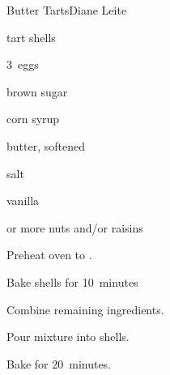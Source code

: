 \begin{recipe}{Butter Tarts}{Diane Leite}{}

\begin{ingredients}
\item tart shells
\item 3~eggs
\item {} brown sugar
\item \C{\half} corn syrup
\item \C{\quarter} butter, softened
\item \tp{\half} salt
\item {} vanilla
\item {} or more nuts and/or raisins
\end{ingredients}

\begin{directions}
\item Preheat oven to .
\item Bake shells for 10~minutes
\item Combine remaining ingredients.
\item Pour mixture into shells.
\item Bake for 20~minutes.
\end{directions}

\end{recipe}
